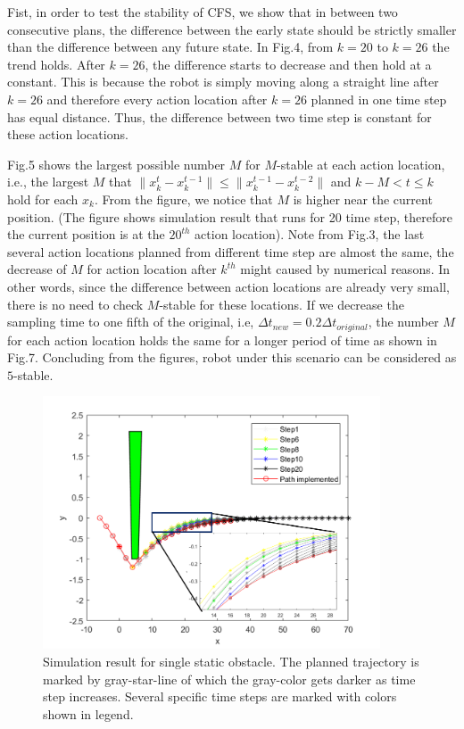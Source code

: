 \documentclass{ifacconf}
\begin{document}
Fist, in order to test the stability of CFS, we show that in between two consecutive plans, the difference between the early state should be strictly smaller than the difference between any future state. In Fig.4, from $k=20$ to $k=26$ the trend holds. After $k=26$, the difference starts to decrease and then hold at a constant. This is because the robot is simply moving along a straight line after $k=26$ and therefore every action location after $k=26$ planned in one time step has equal distance. Thus, the difference between two time step is constant for these action locations. 




Fig.5 shows the largest possible number $M$ for $M$-stable at each action location, i.e., the largest $M$ that  $\|x_{k}^t-x_k^{t-1}\|\leq \|x_k^{t-1}-x_k^{t-2}\|$ and $k-M< t\leq k$ hold for each $x_k$. From the figure, we  notice that $M$ is higher near the current position. (The figure shows simulation result that runs for 20 time step, therefore the current position is at the $20^{th}$ action location). Note from Fig.3, the last several action locations planned from different time step are almost the same, the decrease of $M$ for action location after $k^{th}$ might caused by numerical reasons. In other words, since the difference between action locations are already very small, there is no need to check $M$-stable for these locations. If we decrease the sampling time to one fifth of the original, i.e, $\Delta t_{new}=0.2\Delta t_{original}$, the number $M$ for each action location holds the same for a longer period of time as shown in Fig.7. Concluding from the figures, robot under this scenario can be considered as $5$-stable.

 

\begin{figure}[htbp]
\begin{center}
\includegraphics[width=10cm]{src/1_1.png}
\caption{Simulation result for single static obstacle. The planned trajectory is marked by gray-star-line of which the gray-color gets darker as time step increases. Several specific time steps are marked with colors shown in legend.  }
\label{fig: mpc}
\end{center}
\end{figure}
\end{document}
